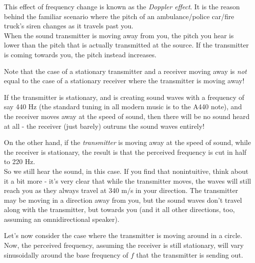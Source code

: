 This effect of frequency change is known as the \emph{Doppler effect}. It is the reason behind the familiar scenario where the pitch of an ambulance/police car/fire truck's siren changes as it travels past you.\\
When the sound transmitter is moving away from you, the pitch you hear is lower than the pitch that is actually transmitted at the source. If the transmitter is coming towards you, the pitch instead increases.

Note that the case of a stationary transmitter and a receiver moving away is \emph{not} equal to the case of a stationary receiver where the transmitter is moving away!

If the transmitter is stationary, and is creating sound waves with a frequency of say 440 Hz (the standard tuning in all modern music is to the A440 note), and the receiver moves away at the speed of sound, then there will be no sound heard at all - the receiver (just barely) outruns the sound waves entirely!

On the other hand, if the \emph{transmitter} is moving away at the speed of sound, while the receiver is stationary, the result is that the perceived frequency is cut in half to 220 Hz.\\
So we still hear the sound, in this case. If you find that nonintuitive, think about it a bit more - it's very clear that while the transmitter moves, the waves will still reach you as they always travel at 340 m/s in your direction. The transmitter may be moving in a direction away from you, but the sound waves don't travel along with the transmitter, but towards you (and it all other directions, too, assuming an omnidirectional speaker).

Let's now consider the case where the transmitter is moving around in a circle. Now, the perceived frequency, assuming the receiver is still stationary, will vary sinusoidally around the base frequency of $f$ that the transmitter is sending out.

\begin{figure}[H]
  \centering
\end{figure}
  

